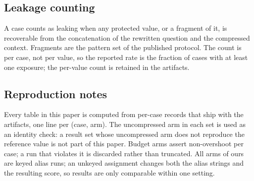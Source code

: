 \subsection{Leakage counting}

A case counts as leaking when any protected value, or a fragment of it, is recoverable from
the concatenation of the rewritten question and the compressed context. Fragments are the
pattern set of the published protocol. The count is per case, not per value, so the reported
rate is the fraction of cases with at least one exposure; the per-value count is retained in
the artifacts.

\subsection{Reproduction notes}

Every table in this paper is computed from per-case records that ship with the artifacts, one
line per (case, arm). The uncompressed arm in each set is used as an identity check: a result
set whose uncompressed arm does not reproduce the reference value is not part of this paper.
Budget arms assert non-overshoot per case; a run that violates it is discarded rather than
truncated. All arms of ours are keyed alias runs; an unkeyed assignment changes both the
alias strings and the resulting score, so results are only comparable within one setting.
